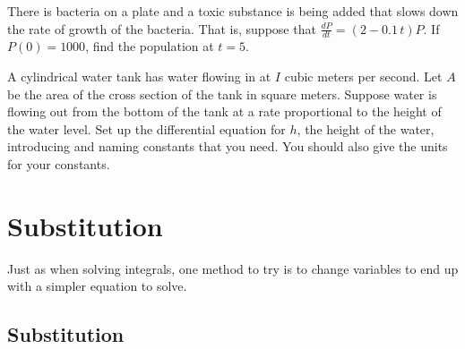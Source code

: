 \begin{exercise}
There is bacteria on a plate and a toxic substance is being added that slows
down the rate of growth of the bacteria.
That is,
suppose that $\frac{dP}{dt} = (2-0.1\,t)P$.  If $P(0) = 1000$, find
the population at $t=5$.
\end{exercise}

\begin{exercise}
A cylindrical water tank has water flowing in at $I$ cubic meters
per second.
Let $A$ be the area of the cross section of the tank in square meters.
Suppose water is
flowing out from the bottom of the tank at a rate proportional to the height of
the water level.  Set up the differential equation for $h$, the height of the
water, introducing and naming
constants that you need.  You should also give the units for your constants.
\end{exercise}


\sectionnewpage
\section{Substitution}
\label{substitution:section}


Just as when solving integrals, one method to try is to change variables to
end up with a simpler equation to solve.

\subsection{Substitution}

